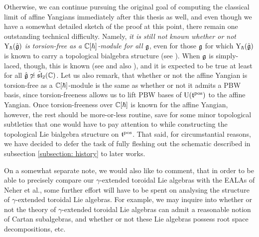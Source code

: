         Otherwise, we can continue pursuing the original goal of computing the classical limit of affine Yangians immediately after this thesis as well, and even though we have a somewhat detailed sketch of the proof at this point, there remain one outstanding technical difficulty. Namely, \textit{it is still not known whether or not $\mathrm{Y}_{\hbar}(\hat{\mathfrak{g}})$ is torsion-free as a $\mathbb{C}[\hbar]$-module for all $\mathfrak{g}$}, even for those $\mathfrak{g}$ for which $\mathrm{Y}_{\hbar}(\hat{\mathfrak{g}})$ is known to carry a topological bialgebra structure (see \cite[Section 5]{guay_nakajima_wendlandt_affine_yangian_coproduct}). When $\mathfrak{g}$ is simply-laced, though, this is known (see \cite[Section 6]{guay_regelskis_wendlandt_affine_yangian_vertex_representations_and_PBW} and also \cite{yang_zhao_affine_yangian_PBW}), and it is expected to be true at least for all $\hat{\mathfrak{g}} \not \simeq \hat{\mathfrak{sl}}_2(\mathbb{C})$. Let us also remark, that whether or not the affine Yangian is torsion-free as a $\mathbb{C}[\hbar]$-module is the same as whether or not it admits a PBW basis, since torsion-freeness allows us to lift PBW bases of $\mathrm{U}(\mathfrak{t}^{\mathrm{pos}})$ to the affine Yangian. Once torsion-freeness over $\mathbb{C}[\hbar]$ is known for the affine Yangian, however, the rest should be more-or-less routine, save for some minor topological subtleties that one would have to pay attention to while constructing the topological Lie bialgebra structure on $\mathfrak{t}^{\mathrm{pos}}$. That said, for circumstantial reasons, we have decided to defer the task of fully fleshing out the schematic described in subsection \ref{subsection: history} to later works.  
        
        On a somewhat separate note, we would also like to comment, that in order to be able to precisely compare our $\gamma$-extended toroidal Lie algebras with the EALAs of Neher et al., some further effort will have to be spent on analysing the structure of $\gamma$-extended toroidal Lie algebras. For example, we may inquire into whether or not the theory of $\gamma$-extended toroidal Lie algebras can admit a reasonable notion of Cartan subalgebras, and whether or not these Lie algebras possess root space decompositions, etc.
        
